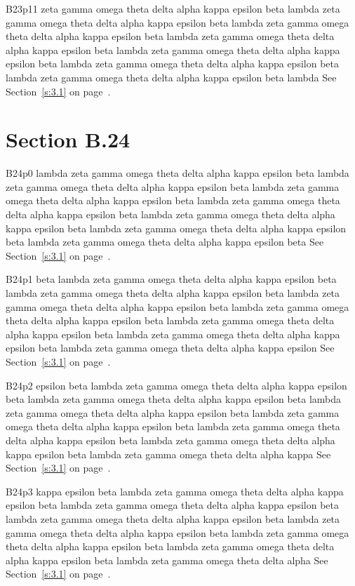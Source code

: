 B23p11 zeta gamma omega theta delta alpha kappa epsilon beta lambda zeta gamma omega theta delta alpha kappa epsilon beta lambda zeta gamma omega theta delta alpha kappa epsilon beta lambda zeta gamma omega theta delta alpha kappa epsilon beta lambda zeta gamma omega theta delta alpha kappa epsilon beta lambda zeta gamma omega theta delta alpha kappa epsilon beta lambda zeta gamma omega theta delta alpha kappa epsilon beta lambda See Section~\ref{s:3.1} on page~\pageref{s:3.1}.

\section{Section B.24}\label{s:B.24}
B24p0 lambda zeta gamma omega theta delta alpha kappa epsilon beta lambda zeta gamma omega theta delta alpha kappa epsilon beta lambda zeta gamma omega theta delta alpha kappa epsilon beta lambda zeta gamma omega theta delta alpha kappa epsilon beta lambda zeta gamma omega theta delta alpha kappa epsilon beta lambda zeta gamma omega theta delta alpha kappa epsilon beta lambda zeta gamma omega theta delta alpha kappa epsilon beta See Section~\ref{s:3.1} on page~\pageref{s:3.1}.

B24p1 beta lambda zeta gamma omega theta delta alpha kappa epsilon beta lambda zeta gamma omega theta delta alpha kappa epsilon beta lambda zeta gamma omega theta delta alpha kappa epsilon beta lambda zeta gamma omega theta delta alpha kappa epsilon beta lambda zeta gamma omega theta delta alpha kappa epsilon beta lambda zeta gamma omega theta delta alpha kappa epsilon beta lambda zeta gamma omega theta delta alpha kappa epsilon See Section~\ref{s:3.1} on page~\pageref{s:3.1}.

B24p2 epsilon beta lambda zeta gamma omega theta delta alpha kappa epsilon beta lambda zeta gamma omega theta delta alpha kappa epsilon beta lambda zeta gamma omega theta delta alpha kappa epsilon beta lambda zeta gamma omega theta delta alpha kappa epsilon beta lambda zeta gamma omega theta delta alpha kappa epsilon beta lambda zeta gamma omega theta delta alpha kappa epsilon beta lambda zeta gamma omega theta delta alpha kappa See Section~\ref{s:3.1} on page~\pageref{s:3.1}.

B24p3 kappa epsilon beta lambda zeta gamma omega theta delta alpha kappa epsilon beta lambda zeta gamma omega theta delta alpha kappa epsilon beta lambda zeta gamma omega theta delta alpha kappa epsilon beta lambda zeta gamma omega theta delta alpha kappa epsilon beta lambda zeta gamma omega theta delta alpha kappa epsilon beta lambda zeta gamma omega theta delta alpha kappa epsilon beta lambda zeta gamma omega theta delta alpha See Section~\ref{s:3.1} on page~\pageref{s:3.1}.

